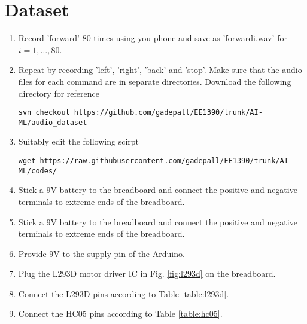 \documentclass[journal,12pt,twocolumn]{IEEEtran}
\renewcommand\thesection{\arabic{section}}
\begin{document}
\section{Dataset}
%
\begin{enumerate}[label=\thesection.\arabic*
,ref=\thesection.\theenumi]

\item Record 'forward' 80 times using you phone and save as 'forwardi.wav' for $i 
= 1,\dots, 80$.
%
\item Repeat by recording 'left', 'right', 'back' and 'stop'. Make sure that the 
audio files for each command are in separate directories. Download the following 
directory for reference
\begin{lstlisting}
svn checkout https://github.com/gadepall/EE1390/trunk/AI-ML/audio_dataset
\end{lstlisting}
\item Suitably edit the following scirpt
\begin{lstlisting}
wget https://raw.githubusercontent.com/gadepall/EE1390/trunk/AI-ML/codes/
\end{lstlisting}
%
%

\item Stick a 9V battery to the breadboard and connect the positive and negative 
terminals to extreme ends of the breadboard.
%
\item 
Stick a 9V battery to the breadboard and connect the positive and negative terminals to extreme ends of the breadboard.
%
\item
Provide 9V to the supply pin of the Arduino.
%
\item
Plug the L293D motor driver IC in Fig. \ref{fig:l293d} on the breadboard.

%
%
\item
Connect the L293D pins according to Table \ref{table:l293d}.

%	
\item
Connect the HC05 pins according to Table \ref{table:hc05}.


%
%	


\end{enumerate}
%
\end{document}
